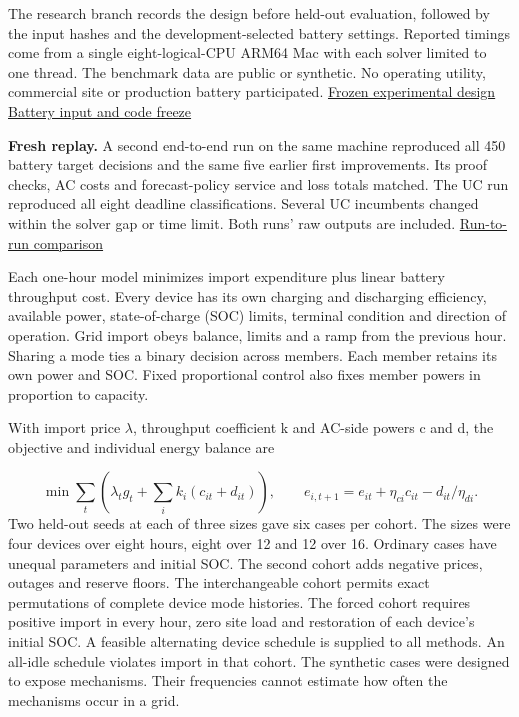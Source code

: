 \documentclass[11pt,letterpaper]{article}
\newcommand{\secname}[1]{\vspace*{2pt}{\LARGE\bfseries\color{accent}#1\par}\vspace{5pt}}
\begin{document}
The research branch records the design before held-out evaluation, followed by the input hashes and the development-selected battery settings. Reported timings come from a single eight-logical-CPU ARM64 Mac with each solver limited to one thread. The benchmark data are public or synthetic. No operating utility, commercial site or production battery participated. \href{https://github.com/nousentllc/VP-VNP-Review/commit/327b1109fbca2e53958818a3ac884e11e6aee724}{Frozen experimental design} \,\textperiodcentered\, \href{https://github.com/nousentllc/VP-VNP-Review/commit/4a2f36919877503b60d093cba22bef1a4a1cfe0b}{Battery input and code freeze}\par
\textbf{Fresh replay.} A second end-to-end run on the same machine reproduced all 450 battery target decisions and the same five earlier first improvements. Its proof checks, AC costs and forecast-policy service and loss totals matched. The UC run reproduced all eight deadline classifications. Several UC incumbents changed within the solver gap or time limit. Both runs' raw outputs are included. \href{https://github.com/nousentllc/VP-VNP-Review/blob/energy-explorations/energy/W03/results/reproduction.json}{Run-to-run comparison}\par
\clearpage
\secname{W03-A \,\textperiodcentered\, Where grouping helped and failed}
Each one-hour model minimizes import expenditure plus linear battery throughput cost. Every device has its own charging and discharging efficiency, available power, state-of-charge (SOC) limits, terminal condition and direction of operation. Grid import obeys balance, limits and a ramp from the previous hour. Sharing a mode ties a binary decision across members. Each member retains its own power and SOC. Fixed proportional control also fixes member powers in proportion to capacity.\par
With import price \ensuremath{\lambda}, throughput coefficient k and AC-side powers c and d, the objective and individual energy balance are\par
\[\min \sum_t \left(\lambda_t g_t+\sum_i k_i(c_{it}+d_{it})\right),\qquad e_{i,t+1}=e_{it}+\eta_{ci}c_{it}-d_{it}/\eta_{di}.\]
Two held-out seeds at each of three sizes gave six cases per cohort. The sizes were four devices over eight hours, eight over 12 and 12 over 16. Ordinary cases have unequal parameters and initial SOC. The second cohort adds negative prices, outages and reserve floors. The interchangeable cohort permits exact permutations of complete device mode histories. The forced cohort requires positive import in every hour, zero site load and restoration of each device's initial SOC. A feasible alternating device schedule is supplied to all methods. An all-idle schedule violates import in that cohort. The synthetic cases were designed to expose mechanisms. Their frequencies cannot estimate how often the mechanisms occur in a grid.\par
\end{document}
